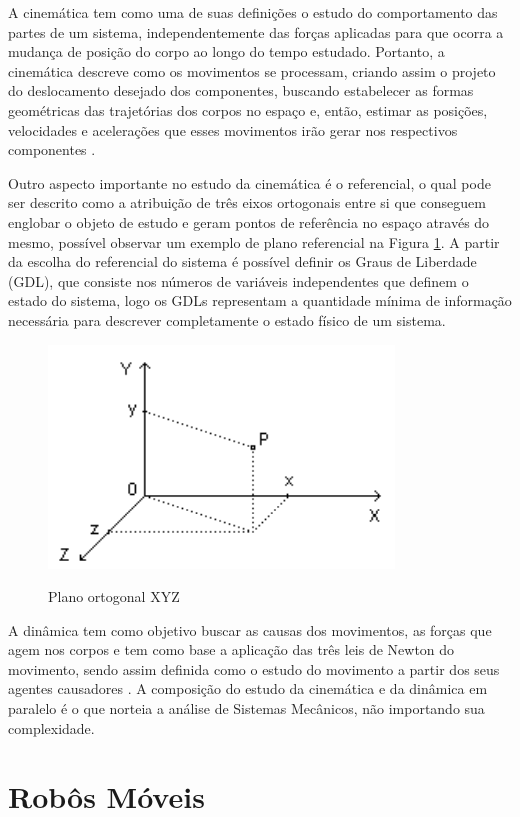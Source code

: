 \documentclass[deposito, acronym, symbols]{fei}
\begin{document}
A cinemática tem como uma de suas definições o estudo do comportamento das partes de um sistema, independentemente das forças aplicadas para que ocorra a mudança de posição do corpo ao longo do tempo estudado. Portanto, a cinemática descreve como os movimentos se processam, criando assim o projeto do deslocamento desejado dos componentes, buscando estabelecer as formas geométricas das trajetórias dos corpos no espaço e, então, estimar as posições, velocidades e acelerações que esses movimentos irão gerar nos respectivos componentes \cite{norton2010cinematica}. 

Outro aspecto importante no estudo da cinemática é o referencial, o qual pode ser descrito como a atribuição de três eixos ortogonais entre si que conseguem englobar o objeto de estudo e geram pontos de referência no espaço através do mesmo, possível observar um exemplo de plano referencial na Figura \ref{fig:planoxyz}. A partir da escolha do referencial do sistema é possível definir os Graus de Liberdade (GDL), que consiste nos números de variáveis independentes que definem o estado do sistema, logo os GDLs representam a quantidade mínima de informação necessária para descrever completamente o estado físico de um sistema. 

\begin{figure}[!htb]
    \centering
    \caption{Plano ortogonal XYZ}
    \includegraphics[width=0.5\linewidth]{Imagens/Referencial plano XYZ.png}
    \label{fig:planoxyz}
\end{figure}

A dinâmica tem como objetivo buscar as causas dos movimentos, as forças que agem nos corpos e tem como base a aplicação das três leis de Newton do movimento, sendo assim definida como o estudo do movimento a partir dos seus agentes causadores \cite{cinematica}. A composição do estudo da cinemática e da dinâmica em paralelo é o que norteia a análise de Sistemas Mecânicos, não importando sua complexidade.

\section{Robôs Móveis}
\end{document}
